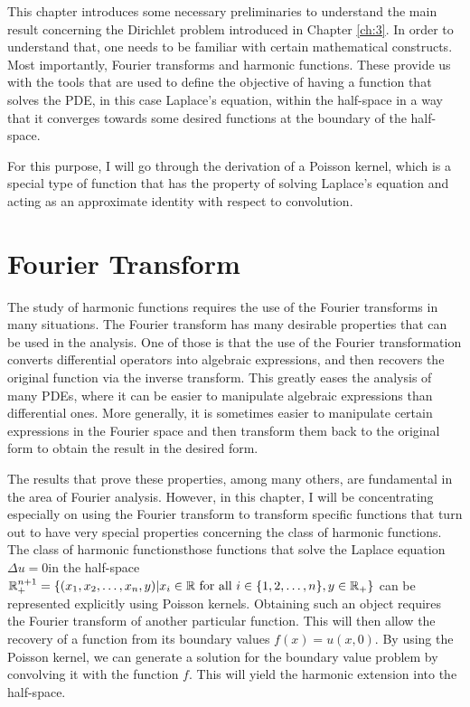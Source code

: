 This chapter introduces some necessary preliminaries to understand the main result concerning the Dirichlet problem introduced in Chapter \ref{ch:3}. In order to understand that, one needs to be familiar with certain mathematical constructs. Most importantly, Fourier transforms and harmonic functions. These provide us with the tools that are used to define the objective of having a function that solves the PDE, in this case Laplace's equation, within the half-space in a way that it converges towards some desired functions at the boundary of the half-space.

For this purpose, I will go through the derivation of a Poisson kernel, which is a special type of function that has the property of solving Laplace's equation and acting as an approximate identity with respect to convolution.

\section{Fourier Transform}

The study of harmonic functions requires the use of the Fourier transforms in many situations. The Fourier transform has many desirable properties that can be used in the analysis. One of those is that the use of the Fourier transformation converts differential operators into algebraic expressions, and then recovers the original function via the inverse transform. This greatly eases the analysis of many PDEs, where it can be easier to manipulate algebraic expressions than differential ones. More generally, it is sometimes easier to manipulate certain expressions in the Fourier space and then transform them back to the original form to obtain the result in the desired form.

The results that prove these properties, among many others, are fundamental in the area of Fourier analysis. However, in this chapter, I will be concentrating especially on using the Fourier transform to transform specific functions that turn out to have very special properties concerning the class of harmonic functions. The class of harmonic functions\textemdash those functions that solve the Laplace equation $\Delta u=0$\textemdash in the half-space $\mathbb R_+^{n+1}=\{(x_1,x_2,\ldots,x_n,y)|x_i\in\mathbb R\text{ for all }i\in\{1,2,\ldots,n\}, y\in\mathbb R_+\}$ can be represented explicitly using Poisson kernels. Obtaining such an object requires the Fourier transform of another particular function. This will then allow the recovery of a function from its boundary values $f(x)=u(x,0)$. By using the Poisson kernel, we can generate a solution for the boundary value problem by convolving it with the function $f$. This will yield the harmonic extension into the half-space.

